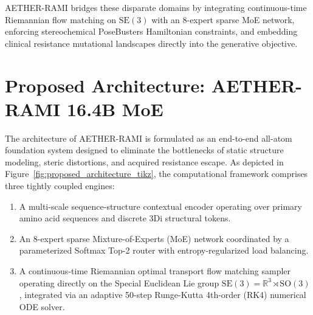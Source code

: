 \documentclass[10pt,journal,compsoc]{IEEEtran}
\begin{document}
AETHER-RAMI bridges these disparate domains by integrating continuous-time Riemannian flow matching on $\mathrm{SE}(3)$ with an 8-expert sparse MoE network, enforcing stereochemical PoseBusters Hamiltonian constraints, and embedding clinical resistance mutational landscapes directly into the generative objective.
\section{Proposed Architecture: AETHER-RAMI 16.4B MoE}
\label{sec:arch}
The architecture of AETHER-RAMI is formulated as an end-to-end all-atom foundation system designed to eliminate the bottlenecks of static structure modeling, steric distortions, and acquired resistance escape. As depicted in Figure~\ref{fig:proposed_architecture_tikz}, the computational framework comprises three tightly coupled engines:
\begin{enumerate}
    \item A multi-scale sequence-structure contextual encoder operating over primary amino acid sequences and discrete 3Di structural tokens.
    \item An 8-expert sparse Mixture-of-Experts (MoE) network coordinated by a parameterized Softmax Top-2 router with entropy-regularized load balancing.
    \item A continuous-time Riemannian optimal transport flow matching sampler operating directly on the Special Euclidean Lie group $\mathrm{SE}(3) = \mathbb{R}^3 \rtimes \mathrm{SO}(3)$, integrated via an adaptive 50-step Runge-Kutta 4th-order (RK4) numerical ODE solver.
\end{enumerate}
\end{document}
